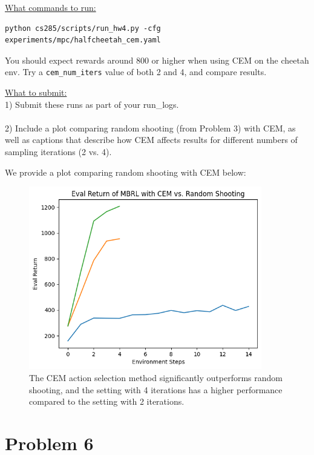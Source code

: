 \documentclass{article} %
\begin{document}
\underline{What commands to run:}\\
\begin{lstlisting}[escapechar=@]
python cs285/scripts/run_hw4.py -cfg experiments/mpc/halfcheetah_cem.yaml
\end{lstlisting}

You should expect rewards around 800 or higher when using CEM on the cheetah env. Try a \verb+cem_num_iters+ value of both 2 and 4, and compare results.

\underline{What to submit:}\\
1) Submit these runs as part of your run\_logs.\\ \\
2) Include a plot comparing random shooting (from Problem 3) with CEM, as well as captions that describe how CEM affects results for different numbers of sampling iterations (2 vs. 4).

\begin{sol}
  We provide a plot comparing random shooting with CEM below:
  \begin{figure}[ht!]
    \color{darkblue}
    \begin{center}
      \includegraphics[width=4in]{images/q5/cem.png}
    \end{center}
    \caption{The CEM action selection method significantly outperforms random shooting, and the setting with 4 iterations has a higher performance compared to the setting with 2 iterations.}
  \end{figure}
\end{sol}

\newpage
\section*{Problem 6}
\end{document}
